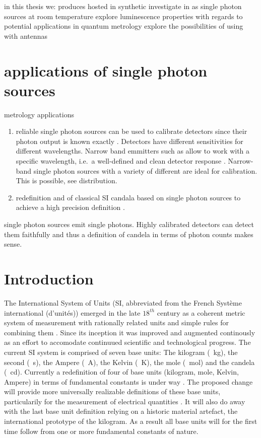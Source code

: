 			in this thesis we:
				produces \sivs hosted in synthetic \nds
				investigate \sivs in \nds as single photon sources at room temperature
				explore luminescence properties with regards to potential applications in quantum metrology
				explore the possibilities of using \sivs with antennas


		\section{applications of single photon sources}

			metrology applications

			\begin{enumerate}
					\item reliable single photon sources can be used to calibrate detectors since their photon output is known exactly \cite{Vaigu2017}. Detectors have different sensitivities for different wavelengths. Narrow band emmitters such as \sivs allow to work with a specific wavelength, i.e.\ a well-defined and clean detector response \cite{Rodiek2017}. Narrow-band single photon sources with a variety of different \wl are ideal for calibration. This is possible, see distribution.
					\item redefinition and of classical SI candala based on single photon sources to achieve a high precision definition \cite{SIQUTE}.
			\end{enumerate}

			single photon sources emit single photons. Highly calibrated detectors can detect them faithfully and thus a definition of candela in terms of photon counts makes sense.


		\section{Introduction}

			The International System of Units (SI, abbreviated from the French Système international (d'unités)) emerged in the late $18^{th}$ century as a coherent metric system of measurement with rationally related units and simple rules for combining them \cite{zwinckels::1}. Since its inception it was improved and augmented continously as an effort to accomodate continuued scientific and technological progress. The current SI system is comprised of seven base units: The kilogram (\SI{}{\kg}), the second (\SI{}{\s}), the Ampere (\SI{}{\ampere}), the Kelvin (\SI{}{\kelvin}), the mole (\SI{}{\mole}) and the candela (\SI{}{\candela}). Currently a redefinition of four of base units (kilogram, mole, Kelvin, Ampere) in terms of fundamental constants is under way \cite{zwinckels::3, Milton, Martin (14 November 2016). Highlights in the work of the BIPM in 2016}. The proposed change will provide more universally realizable definitions of these base units, particularily for the measurement of electrical quantities \cite{zwinckels::paper}. It will also do away with the last base unit definition relying on a historic material artefact, the international prototype of the kilogram. As a result all base units will for the first time follow from one or more fundamental constants of nature.

